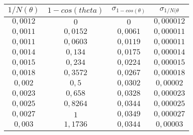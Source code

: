 \begin{tabular}{| c | c | c | c |}
\hline
$1/N(\theta)$ & $1 - cos(theta)$ & $\sigma_{1 - cos(\theta)}$ & $\sigma_{1/N(\theta}$\\
\hline
$0,0012$ & $0$ & $0$ & $0,000012$\\
\hline
$0,0011$ & $0,0152$ & $0,0061$ & $0,000011$\\
\hline
$0,0011$ & $0,0603$ & $0,0119$ & $0,000011$\\
\hline
$0,0014$ & $0,134$ & $0,0175$ & $0,000014$\\
\hline
$0,0015$ & $0,234$ & $0,0224$ & $0,000015$\\
\hline
$0,0018$ & $0,3572$ & $0,0267$ & $0,000018$\\
\hline
$0,002$ & $0,5$ & $0,0302$ & $0,00002$\\
\hline
$0,0023$ & $0,658$ & $0,0328$ & $0,000023$\\
\hline
$0,0025$ & $0,8264$ & $0,0344$ & $0,000025$\\
\hline
$0,0027$ & $1$ & $0,0349$ & $0,000027$\\
\hline
$0,003$ & $1,1736$ & $0,0344$ & $0,00003$\\
\hline
\end{tabular}

